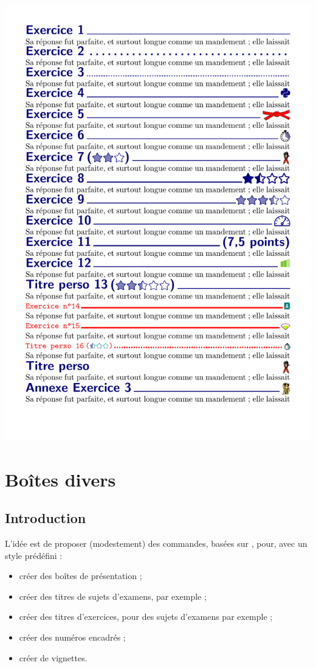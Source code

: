 \documentclass[french,11pt,a4paper]{article}
\begin{document}
\begin{DemoCode}{}
\includegraphics{envtexo_exemples.pdf}
\end{DemoCode}

\pagebreak

\section{Boîtes divers}

\subsection{Introduction}

L'idée est de proposer (modestement) des commandes, basées sur , pour, avec un style prédéfini :

\begin{itemize}
	\item créer des boîtes de présentation ;
	\item créer des titres de sujets d'examens, par exemple ;
	\item créer des titres d'exercices, pour des sujets d'examens par exemple ;
	\item créer des numéros encadrés ;
	\item créer de vignettes.
\end{itemize}
\end{document}
